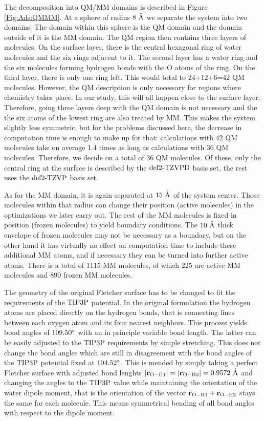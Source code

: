 The decomposition into QM/MM domains is described in Figure \ref{Fig:Ads:QMMM}.
At a sphere of radius $8~\mathring{\text{A}}$ we separate the system into two domains. The
domain within this sphere is the QM domain and the domain outside of it
is the MM domain. 
The QM region then contains three layers of molecules. On the surface layer,
there is the central hexagonal ring of water molecules and the six
rings adjacent to it. The second layer has a water ring and the six
molecules forming hydrogen bonds with the O atoms of the ring. On 
the third layer, there is only one ring left. This would total
to 24+12+6=42 QM molecules. However, the QM description is only
necessary for regions where chemistry takes place. In our study,
this will all happen close to the surface layer. Therefore, going three
layers deep with the QM domain is not necessary and the the six
atoms of the lowest ring are also treated by MM. This makes the system slightly
less symmetric, but for the problems discussed here, the decrease in
computation time is enough to make up for that: calculations with 42 QM molecules
take on average 1.4 times as long as calculations with 36 QM molecules.
Therefore, we decide on a total of 36 QM molecules. Of these, only the central ring at
the surface is described by the $\text{def2-TZVPD}$ basis set, the rest
uses the $\text{def2-TZVP}$ basis set. 

As for the MM domain, it is again separated at $15~\mathring{\text{A}}$ of the system center.
Those molecules within that radius can change their position (active molecules) in the optimizations we
later carry out. The rest of the MM molecules is fixed in position (frozen molecules) to yield
boundary conditions. The $10~\mathring{\text{A}}$ thick envelope of frozen molecules may not be
necessary as a boundary, but on the other hand it has virtually no effect on
computation time to include these additional MM atoms, and if necessary they
can be turned into further active atoms. There is a total of 1115 MM molecules,
of which 225 are active MM molecules and 890 frozen MM molecules.

The geometry of the original Fletcher surface has to be changed to fit the requirements
of the $\text{TIP3P}$ potential. In the original formulation the hydrogen atoms
are placed directly on the hydrogen bonds, that is connecting lines between each oxygen atom
and its four nearest neighbors. This process yields bond angles of $109.50\degree$
with an in principle variable bond length. The latter can be easily adjusted
to the $\text{TIP3P}$ requirements by simple stretching. This does not change the bond angles which
are still in disagreement with the bond angles of the $\text{TIP3P}$ potential
fixed at $104.52\degree$. This is mended by simply taking a perfect
Fletcher surface with adjusted bond lenghts $\left|{\mathbf{r}_{\text O - \text H1}}\right|=\left|{\mathbf{r}_{\text O - \text H2}}\right|=0.9572~\mathring{\text{A}}$
and changing the angles to the $\text{TIP3P}$ value while maintaining
the orientation of the water dipole moment, that is the orientation of the
vector $\mathbf{r}_{\text O - \text H1}+\mathbf{r}_{\text O - \text H2}$ stays the same for each
molecule. This means symmetrical bending of all bond angles with respect to the
dipole moment.

